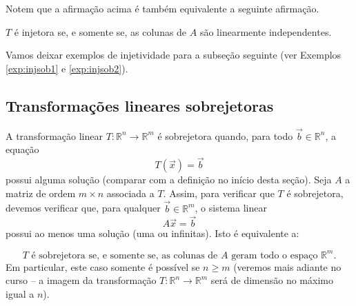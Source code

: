Notem que a afirmação acima é também equivalente a seguinte afirmação.


\begin{prop}
  $T$ é injetora se, e somente se, as colunas de $A$ são linearmente independentes.
\end{prop}

Vamos deixar exemplos de injetividade para a subseção seguinte (ver Exemplos \ref{exp:injsob1} e \ref{exp:injsob2}).

\subsection{Transformações lineares sobrejetoras}

A transformação linear $T: \mathbb{R}^n \to \mathbb{R}^m$ é sobrejetora quando, para todo $\vec{b} \in \mathbb{R}^n$, a equação
\begin{equation}
T(\vec{x}) = \vec{b}
\end{equation} possui alguma solução (comparar com a definição no início desta seção). Seja $A$ a matriz de ordem $m\times n$ associada a $T$. Assim, para verificar que $T$ é sobrejetora, devemos verificar que, para qualquer $\vec{b} \in \mathbb{R}^m$, o sistema linear
\begin{equation}
A\vec{x} = \vec{b}
\end{equation} possui ao menos uma solução (uma ou infinitas). Isto é equivalente a:


\begin{equation}
\boxed{\text{$T$ é sobrejetora se, e somente se, as colunas de $A$ geram todo o espaço $\mathbb{R}^m$.}}
\end{equation} Em particular, este caso somente é possível se $n \ge m$ (veremos mais adiante no curso -- a imagem da transformação $T: \mathbb{R}^n \to \mathbb{R}^m$ será de dimensão no máximo igual a $n$).


